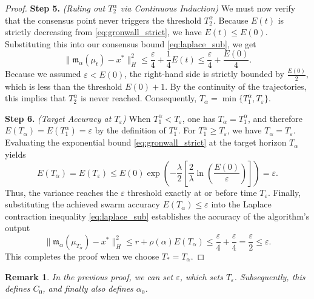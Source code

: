 \documentclass[12pt]{amsart}
\numberwithin{equation}{section}
\newtheorem{remark}[theorem]{Remark}
\begin{document}
\begin{proof}
\textbf{Step 5.} \textit{(Ruling out $T^\alpha_2$ via Continuous Induction)} 
We must now verify that the consensus point never triggers the threshold $T^\alpha_2$. Because $E(t)$ is strictly decreasing from \eqref{eq:gronwall_strict}, we have $E(t) \leq E(0)$. Substituting this into our consensus bound \eqref{eq:laplace_sub}, we get
\begin{equation*}
    \|\mathfrak{m}_{\alpha}(\mu_t) - x^*\|_H^2 \leq \frac{\varepsilon}{4} + \frac{1}{4} E(t) \leq \frac{\varepsilon}{4} + \frac{E(0)}{4}.
\end{equation*}
Because we assumed $\varepsilon < E(0)$, the right-hand side is strictly bounded by $\frac{E(0)}{2}$, which is less than the threshold $E(0) + 1$. By the continuity of the trajectories, this implies that $T^\alpha_2$ is never reached. Consequently, $T_\alpha = \min\{T^\alpha_1, T_\varepsilon\}$.

\textbf{Step 6.} \textit{(Target Accuracy at $T_\varepsilon$)} 
When $T^\alpha_1<T_\varepsilon$, one has $T_\alpha=T^\alpha_1$, and therefore $E(T_\alpha)=E(T^\alpha_1)=\varepsilon$ by the definition of $T^\alpha_1$.
For $T^\alpha_1\geq T_\varepsilon$, we have $T_\alpha=T_\varepsilon$.
Evaluating the exponential bound \eqref{eq:gronwall_strict} at the target horizon $T_\alpha$ yields
\begin{equation*}
      E(T_\alpha)=E(T_\varepsilon) \leq E(0) \exp\left( -\frac{\lambda}{2} \left[ \frac{2}{\lambda} \ln \left( \frac{E(0)}{\varepsilon} \right) \right] \right) = \varepsilon.
\end{equation*}
Thus, the variance reaches the $\varepsilon$ threshold exactly at or before time $T_\varepsilon$. 
Finally, substituting the achieved swarm accuracy $E(T_\alpha) \leq \varepsilon$ into the Laplace contraction inequality \eqref{eq:laplace_sub} establishes the accuracy of the algorithm's output
\begin{equation*}
    \|\mathfrak{m}_{\alpha}(\mu_{T_\alpha}) - x^*\|_H^2 \leq r + \rho(\alpha) E(T_\alpha) \leq \frac{\varepsilon}{4} + \frac{\varepsilon}{4} = \frac{\varepsilon}{2} \leq \varepsilon.
\end{equation*}
This completes the proof when we choose $T_*=T_\alpha$.
\end{proof}

\begin{remark}
In the previous proof, we can set $\varepsilon$, which sets $T_\varepsilon$. Subsequently, this defines $C_0$, and finally also defines $\alpha_0$.
\end{remark}
\end{document}
